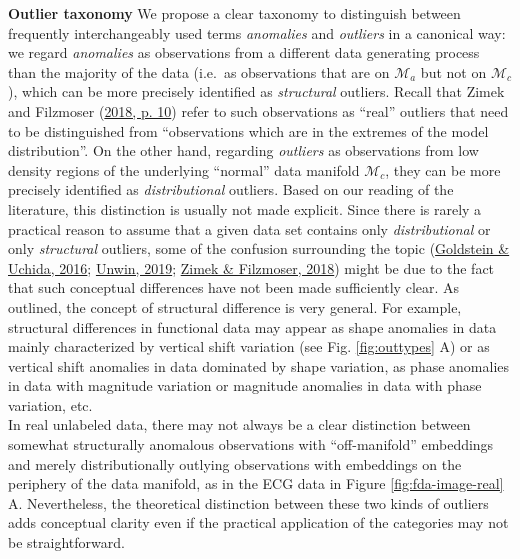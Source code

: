 \documentclass[
  10pt]{article}
\newcommand{\co}{c}
\newcommand{\an}{a}
\newcommand{\Min}{\mathcal{M}_{\co}}
\newcommand{\Man}{\mathcal{M}_{\an}}
\begin{document}
\textbf{Outlier taxonomy} We propose a clear taxonomy to distinguish between frequently interchangeably used terms \emph{anomalies} and \emph{outliers} in a canonical way: we regard \emph{anomalies} as observations from a different data generating process than the majority of the data (i.e.~as observations that are on \(\Man\) but not on \(\Min\)), which can be more precisely identified as \emph{structural} outliers. Recall that Zimek and Filzmoser (\protect\hyperlink{ref-zimek2018there}{2018, p. 10}) refer to such observations as ``real'' outliers that need to be distinguished from ``observations which are in the extremes of the model distribution''. On the other hand, regarding \emph{outliers} as observations from low density regions of the underlying ``normal'' data manifold \(\Min\), they can be more precisely identified as \emph{distributional} outliers.
Based on our reading of the literature, this distinction is usually not made explicit. Since there is rarely a practical reason to assume that a given data set contains only \textit{distributional} or only \textit{structural} outliers, some of the confusion surrounding the topic (\protect\hyperlink{ref-goldstein2016comparative}{Goldstein \& Uchida, 2016}; \protect\hyperlink{ref-unwin2019multivariate}{Unwin, 2019}; \protect\hyperlink{ref-zimek2018there}{Zimek \& Filzmoser, 2018}) might be due to the fact that such conceptual differences have not been made sufficiently clear.
As outlined, the concept of structural difference is very general. For example, structural differences in functional data may appear as shape anomalies in data mainly characterized by vertical shift variation (see Fig. \ref{fig:outtypes} A) or as vertical shift anomalies in data dominated by shape variation, as phase anomalies in data with magnitude variation or magnitude anomalies in data with phase variation, etc.\\
In real unlabeled data, there may not always be a clear distinction between somewhat structurally anomalous observations with ``off-manifold'' embeddings and merely distributionally outlying observations with embeddings on the periphery of the data manifold, as in the ECG data in Figure \ref{fig:fda-image-real} A. Nevertheless, the theoretical distinction between these two kinds of outliers adds conceptual clarity even if the practical application of the categories may not be straightforward.\\
\end{document}
